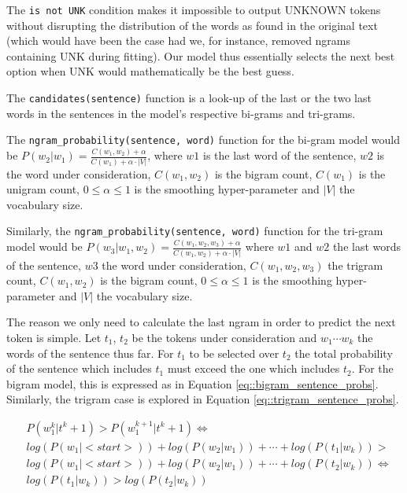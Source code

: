 \documentclass[11pt, a4paper]{article}
\begin{document}
	The \texttt{is not UNK} condition makes it impossible to output UNKNOWN tokens without disrupting the distribution of the words as found in the original text (which would have been the case had we, for instance, removed ngrams containing UNK during fitting). Our model thus essentially selects the next best option when UNK would mathematically be the best guess.
	
	The \texttt{candidates(sentence)} function is a look-up of the last or the two last words in the sentences in the model's respective bi-grams and tri-grams.
	
	The \texttt{ngram\_probability(sentence, word)} function for the bi-gram model would be $ P(w_2|w_1) = \frac{C(w_1,w_2) + \alpha}{C(w_1) + \alpha \cdot|V|} $, where  $w1$ is the last word of the sentence, $w2$ is the word under consideration, $ C(w_1,w_2) $ is the bigram count, $ C(w_1) $ is the unigram count, $ 0 \leq\alpha \leq1 $ is the smoothing hyper-parameter and $\lvert V \rvert$ the vocabulary size.
	
	Similarly, the \texttt{ngram\_probability(sentence, word)} function for the tri-gram model would be $ P(w_3|w_1,w_2) = \frac{C(w_1,w_2,w_3) + \alpha}{C(w_1,w_2) + \alpha \cdot |V|} $ where  $w1$ and $w2$ the last words of the sentence, $w3$ the word under consideration, $ C(w_1,w_2,w_3) $ the trigram count, $ C(w_1,w_2) $ is the bigram count, $ 0 \leq\alpha \leq1 $ is the smoothing hyper-parameter and $\lvert V \rvert$ the vocabulary size.
	
	The reason we only need to calculate the last ngram in order to predict the next token is simple. Let $t_1$, $t_2$ be the tokens under consideration and $w_1 \cdots w_k$ the words of the sentence thus far. For $t_1$ to be selected over $t_2$ the total probability of the sentence which includes $t_1$ must exceed the one which includes $t_2$. For the bigram model, this is expressed as in Equation \ref{eq::bigram_sentence_probs}. Similarly, the trigram case is explored in Equation \ref{eq::trigram_sentence_probs}. 
	
	\begin{equation}
		\label{eq::bigram_sentence_probs}
		\begin{aligned}
			& P(w^{k}_1 | t^k+1) > P(w^{k+1}_1 | t^k+1) \iff \\
			& log(P(w_1|<start>)) + log(P(w_2|w_1)) + \cdots + log(P(t_1|w_k)) > \\
			& log(P(w_1|<start>)) + log(P(w_2|w_1)) + \cdots + log(P(t_2|w_k)) \iff \\
			& log(P(t_1|w_k)) > log(P(t_2|w_k))
		\end{aligned}
	\end{equation}
	
\end{document}
